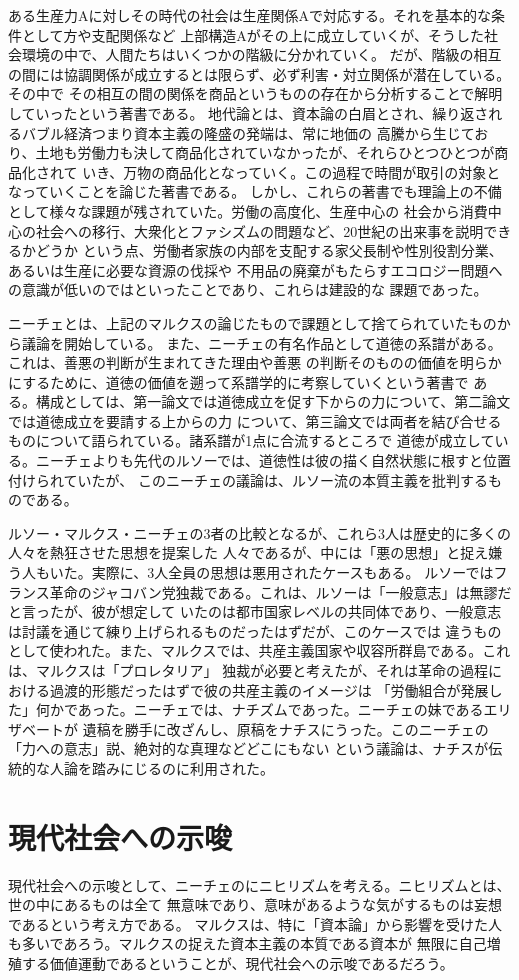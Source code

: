 \documentclass[11pt,a4j]{jsarticle}
\begin{document}
ある生産力Aに対しその時代の社会は生産関係Aで対応する。それを基本的な条件として方や支配関係など
上部構造Aがその上に成立していくが、そうした社会環境の中で、人間たちはいくつかの階級に分かれていく。
だが、階級の相互の間には協調関係が成立するとは限らず、必ず利害・対立関係が潜在している。その中で
その相互の間の関係を商品というものの存在から分析することで解明していったという著書である。
地代論とは、資本論の白眉とされ、繰り返されるバブル経済つまり資本主義の隆盛の発端は、常に地価の
高騰から生じており、土地も労働力も決して商品化されていなかったが、それらひとつひとつが商品化されて
いき、万物の商品化となっていく。この過程で時間が取引の対象となっていくことを論じた著書である。
しかし、これらの著書でも理論上の不備として様々な課題が残されていた。労働の高度化、生産中心の
社会から消費中心の社会への移行、大衆化とファシズムの問題など、20世紀の出来事を説明できるかどうか
という点、労働者家族の内部を支配する家父長制や性別役割分業、あるいは生産に必要な資源の伐採や
不用品の廃棄がもたらすエコロジー問題への意識が低いのではといったことであり、これらは建設的な
課題であった。

\par ニーチェとは、上記のマルクスの論じたもので課題として捨てられていたものから議論を開始している。
また、ニーチェの有名作品として道徳の系譜がある。これは、善悪の判断が生まれてきた理由や善悪
の判断そのものの価値を明らかにするために、道徳の価値を遡って系譜学的に考察していくという著書で
ある。構成としては、第一論文では道徳成立を促す下からの力について、第二論文では道徳成立を要請する上からの力
について、第三論文では両者を結び合せるものについて語られている。諸系譜が1点に合流するところで
道徳が成立している。ニーチェよりも先代のルソーでは、道徳性は彼の描く自然状態に根すと位置付けられていたが、
このニーチェの議論は、ルソー流の本質主義を批判するものである。
\par ルソー・マルクス・ニーチェの3者の比較となるが、これら3人は歴史的に多くの人々を熱狂させた思想を提案した
人々であるが、中には「悪の思想」と捉え嫌う人もいた。実際に、3人全員の思想は悪用されたケースもある。
ルソーではフランス革命のジャコバン党独裁である。これは、ルソーは「一般意志」は無謬だと言ったが、彼が想定して
いたのは都市国家レベルの共同体であり、一般意志は討議を通じて練り上げられるものだったはずだが、このケースでは
違うものとして使われた。また、マルクスでは、共産主義国家や収容所群島である。これは、マルクスは「プロレタリア」
独裁が必要と考えたが、それは革命の過程における過渡的形態だったはずで彼の共産主義のイメージは
「労働組合が発展した」何かであった。ニーチェでは、ナチズムであった。ニーチェの妹であるエリザベートが
遺稿を勝手に改ざんし、原稿をナチスにうった。このニーチェの「力への意志」説、絶対的な真理などどこにもない
という議論は、ナチスが伝統的な人論を踏みにじるのに利用された。

\section{現代社会への示唆}
\par 現代社会への示唆として、ニーチェのにニヒリズムを考える。ニヒリズムとは、世の中にあるものは全て
無意味であり、意味があるような気がするものは妄想であるという考え方である。
マルクスは、特に「資本論」から影響を受けた人も多いであろう。マルクスの捉えた資本主義の本質である資本が
無限に自己増殖する価値運動であるということが、現代社会への示唆であるだろう。
\end{document}
